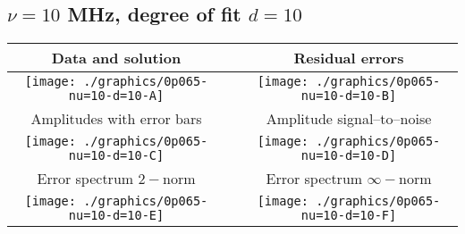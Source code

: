 

% 

\clearpage{}
\break{}

\subsection{$\nu = 10$ MHz, degree of fit $d = 10$}

\begin{table}[h]
    \begin{center}
        \begin{tabular}{ccc}
            Data and solution & \quad & Residual errors \\\hline
            \texttt{[image: ./graphics/0p065-nu=10-d=10-A]} &&
            \texttt{[image: ./graphics/0p065-nu=10-d=10-B]} \\[15pt]
            Amplitudes with error bars && Amplitude signal--to--noise \\\hline
            \texttt{[image: ./graphics/0p065-nu=10-d=10-C]} &&
            \texttt{[image: ./graphics/0p065-nu=10-d=10-D]} \\[15pt]
            Error spectrum $2-$norm && Error spectrum $\infty-$norm \\\hline
            \texttt{[image: ./graphics/0p065-nu=10-d=10-E]} &&
            \texttt{[image: ./graphics/0p065-nu=10-d=10-F]} \\[15pt]
        \end{tabular}
    \end{center}
\label{fig:elev=65, nu=10}
\end{table}



\endinput
